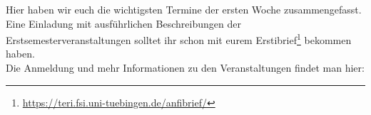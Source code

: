 
Hier haben wir euch die wichtigsten Termine der ersten Woche
zusammengefasst. Eine Einladung mit ausführlichen Beschreibungen der
Erstsemesterveranstaltungen solltet ihr schon mit eurem
Erstibrief\footnote{\url{https://teri.fsi.uni-tuebingen.de/anfibrief/}}
bekommen haben.\\
Die Anmeldung und mehr Informationen zu den Veranstaltungen findet man hier:\\

\newcommand{\event}{\cellcolor{lightlightgray}}


